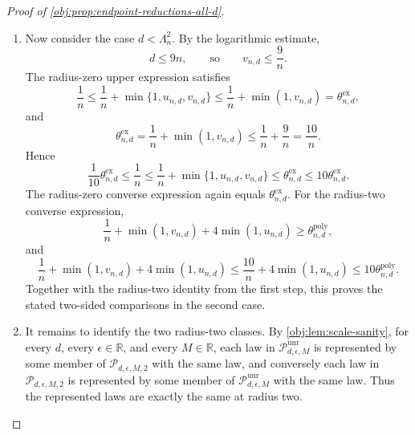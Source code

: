 \documentclass[11pt]{article}
\begin{document}
\begin{proof}[Proof of \cref{obj:prop:endpoint-reductions-all-d}]
\begin{enumerate}
\item Now consider the case \(d<\Lambda_n^2\).  By the logarithmic estimate,
\[
d\le9n,
\qquad\text{so}\qquad
v_{n,d}\le\frac9n.
\]
The radius-zero upper expression satisfies
\[
\frac1n
\le
\frac1n+\min\{1,u_{n,d},v_{n,d}\}
\le
\frac1n+\min(1,v_{n,d})
=
\theta^{\mathrm{ex}}_{n,d},
\]
and
\[
\theta^{\mathrm{ex}}_{n,d}
=\frac1n+\min(1,v_{n,d})
\le
\frac1n+\frac9n
=
\frac{10}{n}.
\]
Hence
\[
\frac1{10}\theta^{\mathrm{ex}}_{n,d}
\le
\frac1n
\le
\frac1n+\min\{1,u_{n,d},v_{n,d}\}
\le
\theta^{\mathrm{ex}}_{n,d}
\le
10\theta^{\mathrm{ex}}_{n,d}.
\]
The radius-zero converse expression again equals \(\theta^{\mathrm{ex}}_{n,d}\).  For the
radius-two converse expression,
\[
\frac1n+\min(1,v_{n,d})+4\min(1,u_{n,d})
\ge
\theta^{\mathrm{poly}}_{n,d},
\]
and
\[
\frac1n+\min(1,v_{n,d})+4\min(1,u_{n,d})
\le
\frac{10}{n}+4\min(1,u_{n,d})
\le
10\theta^{\mathrm{poly}}_{n,d}.
\]
Together with the radius-two identity from the first step, this proves the stated
two-sided comparisons in the second case.

\item It remains to identify the two radius-two classes.  By \cref{obj:lem:scale-sanity}, for
every \(d\), every \(\epsilon\in\mathbb R\), and every \(M\in\mathbb R\), each law in
\(\mathcal P_{d,\epsilon,M}^{\mathrm{unr}}\) is represented by some member of
\(\mathcal P_{d,\epsilon,M,2}\) with the same law, and conversely each law in
\(\mathcal P_{d,\epsilon,M,2}\) is represented by some member of
\(\mathcal P_{d,\epsilon,M}^{\mathrm{unr}}\) with the same law.  Thus the represented laws are
exactly the same at radius two.
\end{enumerate}
\end{proof}
\end{document}
